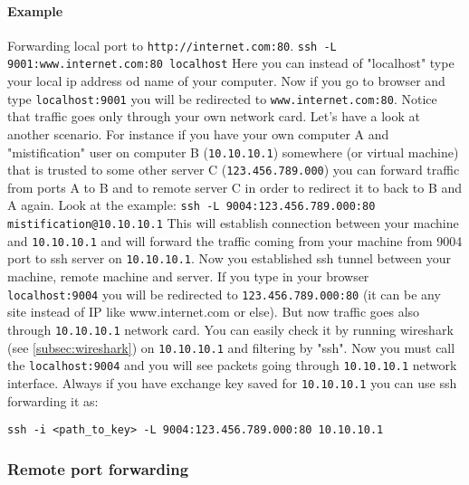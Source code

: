 \documentclass{article}[12pt]
\newcommand{\q}[1]{\texttt{#1}}
\begin{document}
\paragraph{Example} Forwarding local port to \q{http://internet.com:80}. \newline \newline
\texttt{ssh -L 9001:www.internet.com:80 localhost} \newline \newline
Here you can instead of "localhost" type your local ip address od name of your computer.
Now if you go to browser and type \q{localhost:9001} you will be redirected to \q{www.internet.com:80}.
Notice that traffic goes only through your own network card.
\newline
\newline
Let's have a look at another scenario.
For instance if you have your own computer A and "mistification" user on  computer B (\q{10.10.10.1}) somewhere (or virtual machine) that is trusted to some other server C (\q{123.456.789.000}) you can forward traffic from ports A to B and to remote server C in order to redirect it to back to B and A again.
Look at the example: \newline \newline
\texttt{ssh -L 9004:123.456.789.000:80 mistification@10.10.10.1} \newline \newline
This will establish connection between your machine and \q{10.10.10.1} and will forward the traffic coming from your machine from 9004 port to ssh server on \q{10.10.10.1}.
Now you established ssh tunnel between your machine, remote machine and server.
If you type in your browser \q{localhost:9004} you will be redirected to \q{123.456.789.000:80} (it can be any site instead of IP like www.internet.com or else).
But now traffic goes also through \q{10.10.10.1} network card.
You can easily check it by running wireshark (see \ref{subsec:wireshark}) on \q{10.10.10.1} and filtering by "ssh".
Now you must call the \q{localhost:9004} and you will see packets going through \q{10.10.10.1} network interface.
Always if you have exchange key saved for \q{10.10.10.1} you can use ssh forwarding it as:\newline \newline

\q{ssh -i <path\_to\_key> -L 9004:123.456.789.000:80 10.10.10.1}

\subsubsection{Remote port forwarding}
\end{document}
